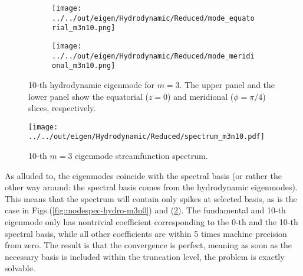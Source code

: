 \begin{figure}[htbp]
    \centering
    \begin{subfigure}[b]{\linewidth}
        \texttt{[image: ../../out/eigen/Hydrodynamic/Reduced/mode\_equatorial\_m3n10.png]}
    \end{subfigure}
    \begin{subfigure}[b]{\linewidth}
        \texttt{[image: ../../out/eigen/Hydrodynamic/Reduced/mode\_meridional\_m3n10.png]}
    \end{subfigure}
    \caption{10-th hydrodynamic eigenmode for $m=3$. The upper panel and the lower panel show the equatorial ($z=0$) and meridional ($\phi=\pi/4$) slices, respectively.}
    \label{fig:eigenmode-hydro-m3n10}
\end{figure}

\begin{figure}[htbp]
    \centering
    \texttt{[image: ../../out/eigen/Hydrodynamic/Reduced/spectrum\_m3n10.pdf]}
    \caption{10-th $m=3$ eigenmode streamfunction spectrum.}
    \label{fig:modespec-hydro-m3n10}
\end{figure}

As alluded to, the eigenmodes coincide with the spectral basis (or rather the other way around: the spectral basis comes from the hydrodynamic eigenmodes). This means that the spectrum will contain only spikes at selected basis, as is the case in Figs.(\ref{fig:modespec-hydro-m3n0}) and (\ref{fig:modespec-hydro-m3n10}).
The fundamental and 10-th eigenmode only has nontrivial coefficient corresponding to the 0-th and the 10-th spectral basis, while all other coefficients are within 5 times machine precision from zero.
The result is that the convergence is perfect, meaning as soon as the necessary basis is included within the truncation level, the problem is exactly solvable.

\clearpage
